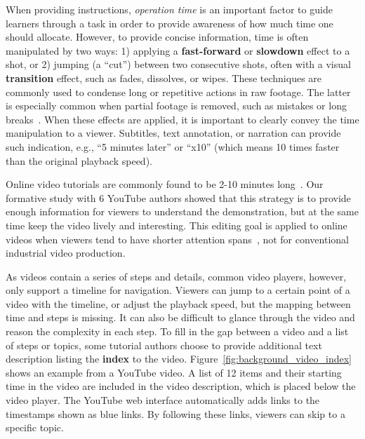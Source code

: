 When providing instructions, \emph{operation time} is an important factor to guide learners through a task in order to provide awareness of how much time one should allocate.
%
However, to provide concise information, time is often manipulated by two ways: 1) applying a \textbf{fast-forward} or \textbf{slowdown} effect to a shot, or 2) jumping (a ``cut'') between two consecutive shots, often with a visual \textbf{transition} effect, such as fades, dissolves, or wipes. These techniques are commonly used to condense long or repetitive actions in raw footage. The latter is especially common when partial footage is removed, such as mistakes or long breaks~\cite{Tseng:2014:PVP:2598510.2598540}.
%
When these effects are applied, it is important to clearly convey the time manipulation to a viewer. Subtitles, text annotation, or narration can provide such indication, e.g., ``5 minutes later'' or ``x10'' (which means 10 times faster than the original playback speed).




Online video tutorials are commonly found to be 2-10 minutes long~\cite{Chi:2013:DGC:2501988.2502052}. Our formative study with 6 YouTube authors showed that this strategy is to provide enough information for viewers to understand the demonstration, but at the same time keep the video lively and interesting. This editing goal is applied to online videos when viewers tend to have shorter attention spans~\cite{YouTubeVideoLength2016,YouTubeVideoLength2012}, not for conventional industrial video production.

As videos contain a series of steps and details, common video players, however, only support a timeline for navigation. Viewers can jump to a certain point of a video with the timeline, or adjust the playback speed, but the mapping between time and steps is missing. It can also be difficult to glance through the video and reason the complexity in each step.
%
To fill in the gap between a video and a list of steps or topics, some tutorial authors choose to provide additional text description listing the \textbf{index} to the video. Figure~\ref{fig:background_video_index} shows an example from a YouTube video. A list of 12 items and their starting time in the video are included in the video description, which is placed below the video player. The YouTube web interface automatically adds links to the timestamps shown as blue links. By following these links, viewers can skip to a specific topic.

